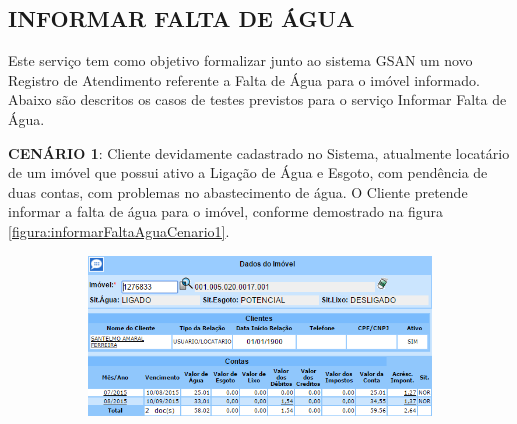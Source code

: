 \begin{flushleft}
\end{flushleft}


\subsection{\textbf{\uppercase{Informar Falta de Água}}}
Este serviço tem como objetivo formalizar junto ao sistema GSAN um novo Registro de Atendimento referente a Falta de Água para o imóvel informado.
Abaixo são descritos os casos de testes previstos para o serviço Informar Falta de Água.
\begin{flushleft}
	\begin{description}
		\item \textbf{CENÁRIO 1}: Cliente devidamente cadastrado no Sistema, atualmente locatário de um imóvel que possui ativo a Ligação de Água e Esgoto, com pendência de duas contas, com problemas no abastecimento de água. O Cliente pretende informar a falta de água para o imóvel, conforme demostrado na figura \ref{figura:informarFaltaAguaCenario1}.
		\begin{figure}[H]
			\centering
			\caption{Informar Falta de Água - Cenário de Teste 1}
			\label{figura:informarFaltaAguaCenario1}
			\begin{subfigure}[H]{\textwidth}
				\centering
				\includegraphics{figuras/cenarios/informar_falta_agua/cenario_1.PNG}
			\end{subfigure}
		\end{figure}
	\end{description}
	

\end{flushleft}
